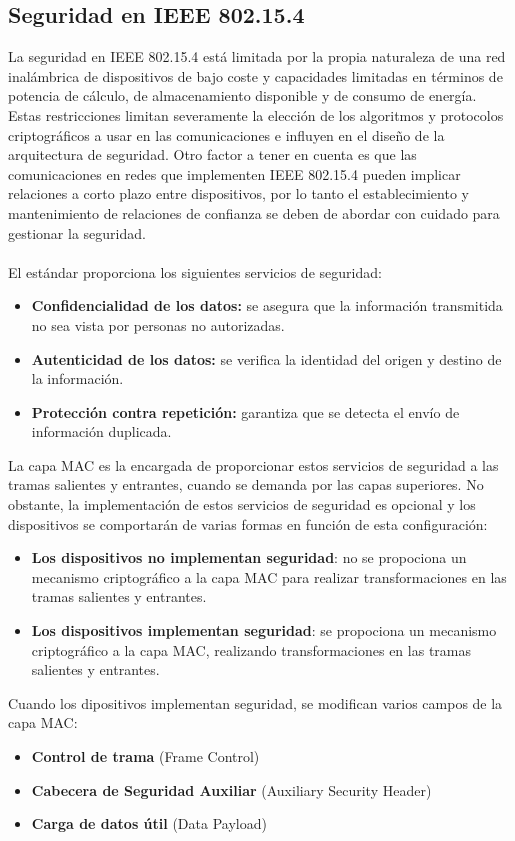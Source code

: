 \subsection{Seguridad en IEEE 802.15.4} %
La seguridad en IEEE 802.15.4 está limitada por la propia naturaleza de una red inalámbrica de dispositivos de bajo coste y capacidades limitadas en términos de potencia de cálculo, de almacenamiento disponible y de consumo de energía. Estas restricciones limitan severamente la elección de los algoritmos y protocolos criptográficos a usar en las comunicaciones e influyen en el diseño de la arquitectura de seguridad. Otro factor a tener en cuenta es que las comunicaciones en redes que implementen IEEE 802.15.4 pueden implicar relaciones a corto plazo entre dispositivos, por lo tanto el establecimiento y mantenimiento de relaciones de confianza se deben de abordar con cuidado para gestionar la seguridad.
\\\\El estándar proporciona los siguientes servicios de seguridad:
\begin{itemize}
\item{\bf Confidencialidad de los datos:} se asegura que la información transmitida no sea vista por personas no autorizadas.
\item{\bf Autenticidad de los datos:} se verifica la identidad del origen y destino de la información.
\item{\bf Protección contra repetición:} garantiza que se detecta el envío de información duplicada.
\end{itemize}
La capa MAC es la encargada de proporcionar estos servicios de seguridad a las tramas salientes y entrantes, cuando se demanda por las capas superiores. No obstante, la implementación de estos servicios de seguridad es opcional y los dispositivos se comportarán de varias formas en función de esta configuración:
\begin{itemize}
\item{\bf Los dispositivos no implementan seguridad}: no se propociona un mecanismo criptográfico a la capa MAC para realizar transformaciones en las tramas salientes y entrantes.
\item{\bf Los dispositivos implementan seguridad}: se propociona un mecanismo criptográfico a la capa MAC, realizando transformaciones en las tramas salientes y entrantes.
\end{itemize}
Cuando los dipositivos implementan seguridad, se modifican varios campos de la capa MAC:
\begin{itemize}
\item{\bf Control de trama} (Frame Control) 
\item{\bf Cabecera de Seguridad Auxiliar} (Auxiliary Security Header)
\item{\bf Carga de datos útil} (Data Payload)
\end{itemize}
